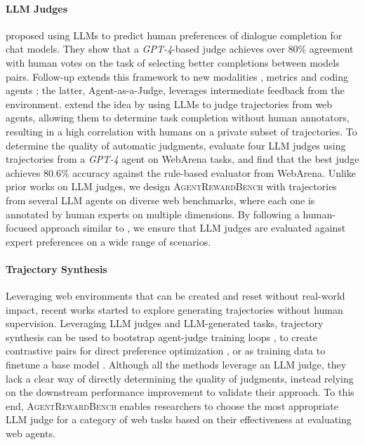 \documentclass{article} %
\newcommand{\arb}{\textsc{AgentRewardBench}}
\begin{document}
\paragraph{LLM Judges}
\citet{zheng2023judgingllmasajudgemtbenchchatbot} proposed using LLMs to predict human preferences of dialogue completion for chat models. They show that a \textit{GPT-4}-based judge achieves over 80\% agreement with human votes on the task of selecting better completions between models pairs. Follow-up  extends this framework to new modalities \citep{chen2024mllmasajudgeassessingmultimodalllmasajudge}, metrics \citep{feizi2025pairbenchvisionlanguagemodelsreliable} and coding agents \citep{zhuge2024agentasajudgeevaluateagentsagents}; the latter, Agent-as-a-Judge, leverages intermediate feedback from the environment.  \citet{He2024WebVoyagerBA} extend the idea by using LLMs to judge trajectories from web agents, allowing them to determine task completion without human annotators, resulting in a high correlation with humans on a private subset of trajectories. To determine the quality of automatic judgments, \citet{AER_pan2024} evaluate four LLM judges using trajectories from a \textit{GPT-4} agent on WebArena tasks, and find that the best judge achieves 80.6\% accuracy against the rule-based evaluator from WebArena. Unlike prior works on LLM judges, we design \arb{} with trajectories from several LLM agents on diverse web benchmarks, where each one is annotated by human experts on multiple dimensions. By following a human-focused approach similar to \citet{rewardbench}, we ensure that LLM judges are evaluated against expert preferences on a wide range of scenarios.

\paragraph{Trajectory Synthesis}
Leveraging web environments that can be created and reset without real-world impact, recent works started to explore generating trajectories without human supervision. Leveraging LLM judges and LLM-generated tasks, trajectory synthesis can be used to bootstrap agent-judge training loops \citep{murty_bagel_2024,nnetnav_murty2025}, to create contrastive pairs \citep{AgentQ_2024} for direct preference optimization \citep{dpo_2023}, or as training data to finetune a base model \citep{autowebglm,patel2024largelanguagemodelsselfimprove,insta_trabucco2025}. Although all the methods leverage an LLM judge, they lack a clear way of directly determining the quality of judgments, instead relying on the downstream performance improvement to validate their approach. To this end, \arb{} enables researchers to choose the most appropriate LLM judge for a category of web tasks based on their effectiveness at evaluating web agents.
\end{document}

